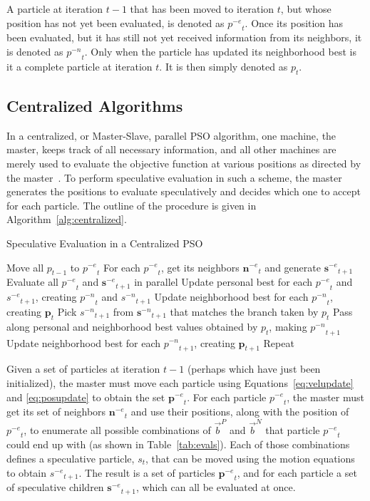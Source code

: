 \documentclass[journal,letterpaper]{IEEEtran}
\newcommand{\alg}[1]{Algorithm~\ref{alg:#1}}
\providecommand{\pers}{\ensuremath{P}}
\providecommand{\neigh}{\ensuremath{N}}
\providecommand{\nbest}{\ensuremath{\Vec{b}^\neigh}}
\providecommand{\pbest}{\ensuremath{\Vec{b}^\pers}}
\providecommand{\noeval}[1]{\ensuremath{#1^{-e}}}
\providecommand{\nonbest}[1]{\ensuremath{#1^{-n}}}
\providecommand{\p}{\ensuremath{p}}
\providecommand{\pset}{\ensuremath{\mathbf{p}}}
\providecommand{\s}{\ensuremath{s}}
\providecommand{\sset}{\ensuremath{\mathbf{s}}}
\providecommand{\nset}{\ensuremath{\mathbf{n}}}
\begin{document}
A particle at iteration $t-1$ that has been moved to iteration $t$, but whose
position has not yet been evaluated, is denoted as $\noeval{\p}_t$.  Once its
position has been evaluated, but it has still not yet received information from
its neighbors, it is denoted as $\nonbest{\p}_t$.  Only when the particle has
updated its neighborhood best is it a complete particle at iteration $t$.  It is
then simply denoted as $\p_t$.

\subsection{Centralized Algorithms}

In a centralized, or Master-Slave, parallel PSO algorithm, one machine, the
master, keeps track of all necessary information, and all other machines are
merely used to evaluate the objective function at various positions as directed
by the master~\cite{belal-ijicis04}.  To perform speculative evaluation in such
a scheme, the master generates the positions to evaluate speculatively and
decides which one to accept for each particle.  The outline of the procedure is
given in \alg{centralized}.

\begin{algorithm}
  \caption{Speculative Evaluation in a Centralized PSO}
  \label{alg:centralized}
  \begin{algorithmic}[1]
	\STATE Move all $\p_{t-1}$ to $\noeval{\p}_t$
	\STATE For each $\noeval{\p}_t$, get its neighbors $\noeval{\nset}_t$ and
	  generate $\noeval{\sset}_{t+1}$
	\STATE Evaluate all $\noeval{\p}_t$ and $\noeval{\sset}_{t+1}$ in parallel
	\STATE Update personal best for each $\noeval{\p}_t$ and
	  $\noeval{\s}_{t+1}$, creating $\nonbest{\p}_t$ and $\nonbest{\s}_{t+1}$
	\STATE Update neighborhood best for each $\nonbest{\p}_t$, creating
	  $\pset_t$
	\FORALL{$\p_t$}
	\STATE Pick $\nonbest{\s}_{t+1}$ from $\nonbest{\sset}_{t+1}$ that matches
	  the branch taken by $\p_t$
	\STATE Pass along personal and neighborhood best values obtained by $\p_t$,
	  making $\nonbest{\p}_{t+1}$
	\ENDFOR
	\STATE Update neighborhood best for each $\nonbest{\p}_{t+1}$, creating
	  $\pset_{t+1}$
	\STATE Repeat
  \end{algorithmic}
\end{algorithm}

Given a set of particles at iteration $t-1$ (perhaps which have just been
initialized), the master must move each particle using
Equations~\eqref{eq:velupdate} and \eqref{eq:posupdate} to obtain the set
$\noeval{\pset}_t$.  For each particle $\noeval{\p}_t$, the master must get its
set of neighbors $\noeval{\nset}_t$ and use their positions, along with the
position of $\noeval{\p}_t$, to enumerate all possible combinations of $\pbest$
and $\nbest$ that particle $\noeval{\p}_t$ could end up with (as shown in
Table~\ref{tab:evals}).  Each of those combinations defines a speculative
particle, $\s_t$, that can be moved using the motion equations to obtain
$\noeval{\s}_{t+1}$.  The result is a set of particles $\noeval{\pset}_t$, and
for each particle a set of speculative children $\noeval{\sset}_{t+1}$, which
can all be evaluated at once.
\end{document}
